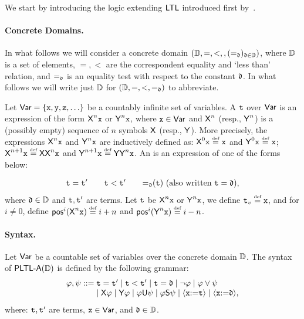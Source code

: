 We start by introducing the logic extending ${\rm\textsf{LTL}}$ introduced first by~\cite{Pnueli77}. 


\paragraph{Concrete Domains.} In what follows we will consider a concrete domain $(\mathbb{D},=,<,,(=_{\mathfrak{d}})_{\mathfrak{d}\in\mathbb{D}})$, where $\mathbb{D}$ is a set of elements, $=,<$ are the correspondent equality and `less than' relation, and $=_{\mathfrak{d}}$ is an equality test with respect to the constant $\mathfrak{d}$.  In what follows we will write just $\mathbb{D}$ for $(\mathbb{D},=,<,=_{\mathfrak{d}})$ to abbreviate.

Let ${\rm \sf Var}=\{\mathtt{x},\mathtt{y},\mathtt{z},\ldots\}$ be a countably infinite set of variables. A  $\mathtt{t}$ over ${\rm \sf Var}$ is an expression of the form ${\operatorname{\sf X}}^n\mathtt{x}$ or ${\operatorname{\sf Y}}^n\mathtt{x}$, where $\mathtt{x}\in{\rm \sf Var}$ and ${\operatorname{\sf X}}^n$ (resp., ${\operatorname{\sf Y}}^n$) is a (possibly empty) sequence of $n$ symbols ${\operatorname{\sf X}}$ (resp., ${\operatorname{\sf Y}}$). 
More precisely, the expressions ${\operatorname{\sf X}}^n\mathtt{x}$ and ${\operatorname{\sf Y}}^n\mathtt{x}$ are inductively defined as: $\Next^0\avar \egdef \avar$ and $\Prev^0\avar \egdef \avar$; $\Next^{n+1}\avar \egdef \Next\Nextn\avar$ and $\Prev^{n+1}\avar \egdef \Prev\Prevn\avar$. 
An  is an expression of one of the forms below:

\[
    \begin{array}{c@{\quad\quad}c@{\quad\quad}c}
        \aterm = \aterm' & \aterm < \aterm' & {=_{\adatum}}(\aterm) \mbox{ (also written $\aterm=\adatum$)},
    \end{array}
\]
where $\mathfrak{d}\in\mathbb{D}$ and $\mathtt{t},\mathtt{t}'$ are terms. Let $\mathtt{t}$ be ${\operatorname{\sf X}}^n\mathtt{x}$ or ${\operatorname{\sf Y}}^n\mathtt{x}$, we define $\aterm_v\egdef\avar$, and for $i\neq 0$, define $\pos^i(\Nextn\avar)\egdef i+n$ and $\pos^i(\Prevn\avar) \egdef i-n$. 

\paragraph{Syntax.} Let ${\rm \sf Var}$ be a countable set of variables over the concrete domain $\mathbb{D}$. The syntax of ${\rm\textsf{PLTL-A}}(\mathbb{D})$ is defined by the following grammar:
\[
    \begin{array}{l@{\;}l}
    \aformula,\aformulabis  ::= & \aterm = \aterm' \mid \aterm < \aterm' \mid \aterm = \adatum \mid \neg\aformula \mid \aformula \vee \aformulabis \\
     &  \mid \Next\aformula \mid \Prev\aformula \mid \aformula \Until \aformulabis \mid \aformula\Since\aformulabis \mid \Assign{\avar}{\aterm} \mid \Assign{\avar}{\adatum},
    \end{array}
\]
where: $\mathtt{t},\mathtt{t}'$ are terms, $\mathtt{x}\in{\rm \sf Var}$, and $\mathfrak{d}\in\mathbb{D}$.  

